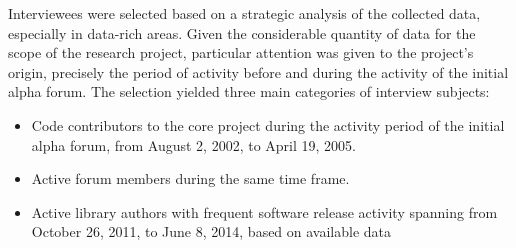 

  
Interviewees were selected based on a strategic analysis of the collected data, especially in data-rich areas. Given the considerable quantity of data for the scope of the research project, particular attention was given to the project's origin, precisely the period of activity before and during the activity of the initial alpha forum. The selection yielded three main categories of interview subjects:
  
\begin{itemize}
    \item Code contributors to the core project during the activity period of the initial alpha forum, from August 2, 2002, to April 19, 2005.
    \item Active forum members during the same time frame.
    \item Active library authors with frequent software release activity spanning from October 26, 2011, to June 8, 2014, based on available data
\end{itemize}


